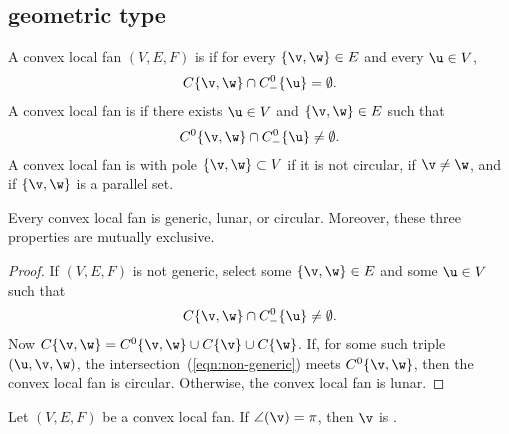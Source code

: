 \subsection{geometric type}\label{sec:types}

\begin{definition}
A convex local fan $(V,E,F)$ is   if for every $\{\v,\w\}\in E$
and every $\u\in V$, 
\begin{displaymath}
C\{\v,\w\}\cap C^0_-\{\u\} = \emptyset.
\end{displaymath}
A convex local fan is   if there exists $\u\in V$ and
$\{\v,\w\}\in E$ such that
\begin{displaymath}
C^0\{\v,\w\}\cap C^0_-\{\u\}\ne \emptyset.
\end{displaymath}
A convex local fan is  with pole $\{\v,\w\} \subset V$ if it is not
circular, if $\v\ne\w$, and if $\{\v,\w\}$ is a parallel set.
\end{definition}
%
%
%


\begin{lemma}[] Every convex local fan is
generic, lunar, or circular.  Moreover, these three properties are
mutually exclusive.
\end{lemma}
%
%
%
%
%

\begin{proof} If $(V,E,F)$ is not generic,  select some $\{\v,\w\}\in E$
and some $\u\in V$ such that
\begin{equation}\label{eqn:non-generic}
C\{\v,\w\}\cap C^0_-\{\u\} \ne \emptyset.
\end{equation}
Now $C\{\v,\w\} = C^0\{\v,\w\} \cup C\{\v\}\cup C\{\w\}$.  If, for
some such triple $(\u,\v,\w)$, the
intersection~(\ref{eqn:non-generic}) meets $C^0\{\v,\w\}$, then the
convex local fan is circular.  Otherwise, the convex local fan is lunar.
\end{proof}

\begin{definition}[flat]
 Let $(V,E,F)$ be a convex local fan.
If $\angle(\v)=\pi$, then $\v$ is .
\end{definition}


